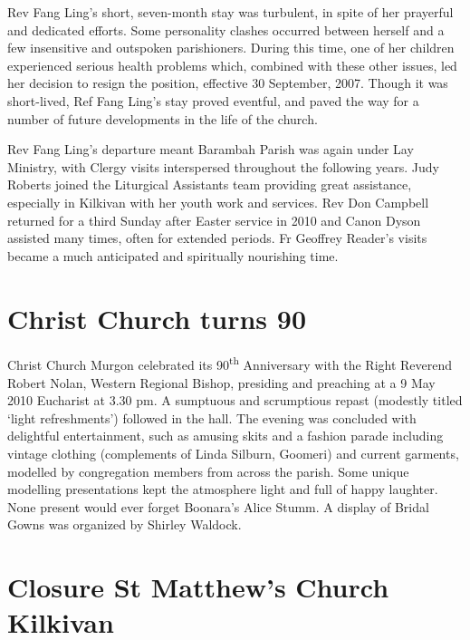 Rev Fang Ling's short, seven-month stay was turbulent, in spite of her prayerful and dedicated efforts. Some personality clashes occurred between herself and a few insensitive and outspoken parishioners. During this time, one of her children experienced serious health problems which, combined with these other issues, led her decision to resign the position, effective 30 September, 2007. Though it was short-lived, Ref Fang Ling's stay proved eventful, and paved the way for a number of future developments in the life of the church.



Rev Fang Ling's departure meant Barambah Parish was again under Lay Ministry, with Clergy visits interspersed throughout the following years. Judy Roberts joined the Liturgical Assistants team providing great assistance, especially in Kilkivan with her youth work and services. Rev Don Campbell returned for a third Sunday after Easter service in 2010 and Canon Dyson assisted many times, often for extended periods. Fr Geoffrey Reader's visits became a much anticipated and spiritually nourishing time.



\section{Christ Church turns 90}



Christ Church Murgon celebrated its 90\textsuperscript{th} Anniversary with the Right Reverend Robert Nolan, Western Regional Bishop, presiding and preaching at a 9 May 2010 Eucharist at 3.30 pm. A sumptuous and scrumptious repast (modestly titled `light refreshments') followed in the hall. The evening was concluded with delightful entertainment, such as amusing skits and a fashion parade including vintage clothing (complements of Linda Silburn, Goomeri) and current garments, modelled by congregation members from across the parish. Some unique modelling presentations kept the atmosphere light and full of happy laughter. None present would ever forget Boonara's Alice Stumm. A display of Bridal Gowns was organized by Shirley Waldock.



\section{Closure St Matthew's Church Kilkivan}



